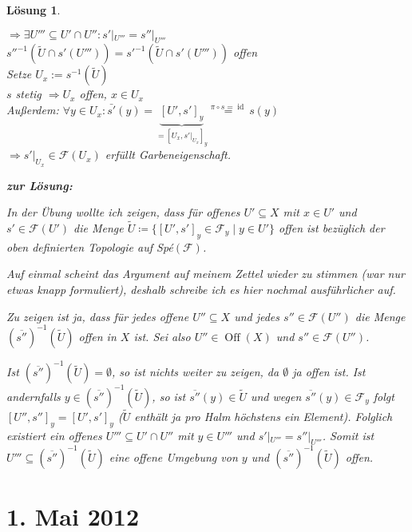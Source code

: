 \documentclass[a4paper,12pt]{report}
\theoremstyle{break}
\newtheorem{Loes}{L\"osung}
\theoremstyle{nonumberbreak}
\theoremstyle{nonumberplain}
\newcommand{\quot}[1]{\textrm{\glqq}{#1}\textrm{\grqq}}
\newenvironment{twosidedproof}{\begin{enumerate}[\quot{$\Rightarrow$}:]}{\end{enumerate}}
\DeclareMathOperator{\Off}{Off}
\DeclareMathOperator{\id}{id}
\newcommand{\calF}{\mathcal{F}}
\begin{document}
\begin{Loes}
\begin{twosidedproof}
  $\Rightarrow \exists U''' \subseteq U'\cap U'': s'|_{U'''} = s''|_{U'''}$\\
  $s''^{-1}(\widetilde U \cap s'(U''')) = s'^{-1}(\widetilde U \cap s'(U'''))$ offen\\
  Setze $U_x:= s^{-1}(\widetilde U)$\\
  $s$ stetig $\Rightarrow U_x$ offen, $x\in U_x$\\
  Au\ss erdem: $\forall y \in U_x: \bar{s'}(y) = \underbrace{[U', s']_y}_{=[U_x, s'|_{U_x}]_y} \overset{\pi \circ s = \id}{=} s(y)$\\
  $\Rightarrow s'|_{U_x} \in \calF(U_x)$ erf\"ullt Garbeneigenschaft.
\end{twosidedproof}

\textbf{zur L\"osung:}

In der \"Ubung wollte ich zeigen, dass f\"ur offenes $U' \subseteq X$ mit $x \in U'$ und $s' \in \mathcal{F}(U')$ die Menge $\tilde{U} \coloneqq \{ [U',s']_y \in \mathcal{F}_y \mid y \in U' \}$ offen ist bez\"uglich der oben definierten Topologie auf Sp\'e$(\mathcal{F})$.

Auf einmal scheint das Argument auf meinem Zettel wieder zu stimmen (war nur etwas knapp formuliert), deshalb schreibe ich es hier nochmal ausf\"uhrlicher auf.

Zu zeigen ist ja, dass f\"ur jedes offene $U'' \subseteq X$ und jedes $s'' \in \mathcal{F}(U'')$ die Menge $\left(\overline{s''}\right)^{-1}\left(\tilde{U}\right)$ offen in $X$ ist. Sei also $U'' \in \Off(X)$ und $s'' \in \mathcal{F}(U'')$.

Ist $\left(\overline{s''}\right)^{-1}\left(\tilde{U}\right) = \emptyset$, so ist nichts weiter zu zeigen, da $\emptyset$ ja offen ist. Ist andernfalls $y \in \left(\overline{s''}\right)^{-1}\left(\tilde{U}\right)$, so ist $ \overline{s''}(y) \in \tilde{U}$ und wegen $\overline{s''}(y) \in \mathcal{F}_y$ folgt $[U'',s'']_y = [U',s']_y$ ($\tilde{U}$ enth\"alt ja pro Halm h\"ochstens ein Element). Folglich existiert ein offenes $U''' \subseteq U' \cap U''$ mit $y \in U'''$ und $s'|_{U'''} = s''|_{U'''}$. Somit ist $U''' \subseteq \left(\overline{s''}\right)^{-1}\left(\tilde{U}\right)$ eine offene Umgebung von $y$ und $\left(\overline{s''}\right)^{-1}\left(\tilde{U}\right)$ offen.

\end{Loes}

\newpage
\section{1. Mai 2012}
\setcounter{Aufg}{0}
\setcounter{Loes}{0}
\end{document}
